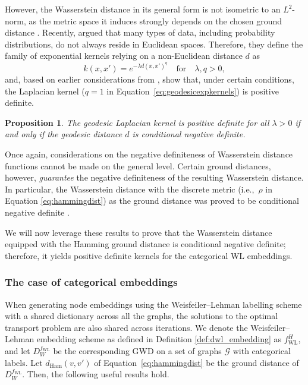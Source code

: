 \documentclass{article}
\newtheorem{proposition}{Proposition}
\begin{document}
However, the Wasserstein distance in its general form is not isometric to an $L^2$-norm, as the metric space it induces strongly depends on the chosen ground distance \citep{figalli2011optimal}.
Recently, \citet{feragen2015geodesic} argued that many types of data, including probability distributions, do not always reside in Euclidean spaces. Therefore, they define the family of exponential kernels relying on a non-Euclidean distance $d$ as 
\begin{equation}
\label{eq:geodesicexpkernels}
    k(x,x') = e^{-\lambda d(x,x')^q} \quad \text{for} \quad \lambda, q > 0,
\end{equation}
and, based on earlier considerations from \citet{berg1984harmonic}, show that, under certain conditions, the Laplacian kernel ($q=1$ in Equation~\ref{eq:geodesicexpkernels}) is positive definite.



\begin{proposition}
\citep{feragen2015geodesic}
\label{prop:feragen2}
The geodesic Laplacian kernel is positive definite for all $\lambda > 0$ if and only if the geodesic distance $d$ is conditional negative definite.
\end{proposition}

Once again, considerations on the negative definiteness of Wasserstein distance functions cannot be made on the general level. Certain ground distances, however, \emph{guarantee} the negative definiteness of the resulting Wasserstein distance. In particular, the Wasserstein distance with the discrete metric (i.e.,\ $\rho$ in Equation \ref{eq:hammingdist}) as the ground distance was proved to be conditional negative definite \citep{gardner2017definiteness}.

We will now leverage these results to prove that the Wasserstein distance equipped with the Hamming ground distance is conditional negative definite; therefore, it yields positive definite kernels for the categorical WL embeddings.



\subsubsection{The case of categorical embeddings}
\label{app:discretewwl}
When generating node embeddings using the Weisfeiler--Lehman labelling scheme with a shared dictionary across all the graphs, the solutions to the optimal transport problem are also shared across iterations.
We denote the Weisfeiler--Lehman embedding scheme as defined in Definition \ref{def:dwl_embedding} as $f^H_{\mathrm{\scriptscriptstyle{WL}}}$, and let $D^{f_{\mathrm{\scriptscriptstyle{WL}}}}_W$ be the corresponding GWD on a set of graphs $\mathcal{G}$ with categorical labels. Let $d_{\mathrm{Ham}}(v,v')$ of Equation~\ref{eq:hammingdist} be the ground distance of $D^{f_{\mathrm{\scriptscriptstyle{WL}}}}_W$. Then, the following useful results hold. 
\end{document}

